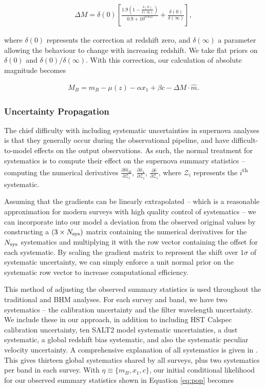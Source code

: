 \documentclass[a4paper,fleqn,usenatbib]{mnras}
\newcommand{\green}{\color{forestgreen}}
\newcommand{\Z}{\mathcal{Z}}
\begin{document}
\begin{align}
\Delta M = \delta(0) \left[ \frac{1.9\left(1 - \frac{\delta(0)}{\delta(\infty)}\right)  }{0.9 + 10^{0.95z}} + \frac{\delta(0)}{\delta(\infty)}\right], \label{eq:mass}
\end{align}

where $\delta(0)$ represents the correction at redshift zero, and $\delta(\infty)$ a parameter allowing the behaviour to change with increasing redshift. We take flat priors on $\delta(0)$ and $\delta(0)/\delta(\infty)$. With this correction, our calculation of absolute magnitude becomes

\begin{align}
M_B = m_B - \mu(z) - \alpha x_1 + \beta c - \Delta M \cdot \hat{m}. \label{eq:l2}
\end{align}



\subsubsection{Uncertainty Propagation}
\label{sec:systreat}
The chief difficulty with including systematic uncertainties in supernova analyses is that they generally occur during the observational pipeline, and have difficult-to-model effects on the output observations. As such, the normal treatment for systematics is to compute their effect on the supernova summary statistics -- computing the numerical derivatives $\frac{\partial \hat{m}_B}{\partial \Z_i}$, $\frac{\partial \hat{x}_1}{\partial \Z_i}$, $\frac{\partial \hat{c}}{\partial \Z_i}$, where $\Z_i$ represents the $i$\textsuperscript{th} systematic.

Assuming that the gradients can be linearly extrapolated -- which is a reasonable approximation for modern surveys with high quality control of systematics -- we can incorporate into our model a deviation from the observed original values by constructing a $(3 \times N_{\rm sys})$ matrix containing the numerical derivatives for the $N_{\rm sys}$ systematics and multiplying it with the row vector containing the offset for each systematic. By scaling the gradient matrix to represent the shift over $1\sigma$ of systematic uncertainty, we can simply enforce a unit normal prior on the systematic row vector to increase computational efficiency.

This method of adjusting the observed summary statistics is used throughout the traditional and BHM analyses. For each survey and band, we have two systematics --  the calibration uncertainty and the filter wavelength uncertainty. We include these in our approach, in addition to including HST Calspec calibration uncertainty, ten SALT2 model systematic uncertainties, a dust systematic, a global redshift bias systematic, and also the systematic peculiar velocity uncertainty. {\green A comprehensive explanation of all systematics is given in \citet{Brout18SYS}.} This gives thirteen global systematics shared by all surveys, plus two systematics per band in each survey. With $\eta \equiv \lbrace m_B, x_1, c \rbrace$, our initial conditional likelihood for our observed summary statistics shown in Equation \eqref{eq:pop} becomes
\end{document}
